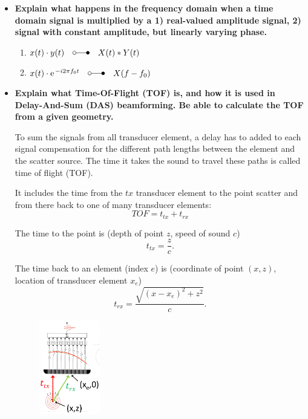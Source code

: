 \documentclass[10pt,a4paper,noendnumber=true]{scrartcl}
\begin{document}
\begin{itemize}
\item \textbf{Explain what happens in the frequency domain when a time domain signal is multiplied by a 1) real-valued amplitude signal, 2) signal with constant amplitude, but linearly varying phase.}
\begin{enumerate}
\item $x(t) \cdot y(t) \quad\laplace\quad X(t) \ast Y(t)$
\item $x(t) \cdot \e^{-i 2 \pi f_0 t} \quad\laplace\quad X(f-f_0)$
\end{enumerate}


\item \textbf{Explain what Time-Of-Flight (TOF) is, and how it is used in Delay-And-Sum (DAS) beamforming. Be able to calculate the TOF from a given geometry.}

To sum the signals from all transducer element, a delay has to added to each signal compensation for the different path lengths between the element and the scatter source. The time it takes the sound to travel these paths is called time of flight (TOF).

It includes the time from the $tx$ transducer element to the point scatter and from there back to one of many transducer elements:
\begin{equation}
TOF = t_{tx} + t_{rx}
\end{equation}

The time to the point is (depth of point $z$, speed of sound $c$)
\begin{equation}
t_{tx} = \frac{z}{c}.
\end{equation}

The time back to an element (index $e$) is (coordinate of point $(x,z)$, location of transducer element $x_e$)
\begin{equation}
t_{rx} = \frac{\sqrt{(x-x_e)^2+z^2}}{c}.
\end{equation}

\begin{figure}[H]
\centering
\includegraphics[width=0.25\textwidth]{img/tof.png}
\end{figure}
\end{itemize}
\end{document}
